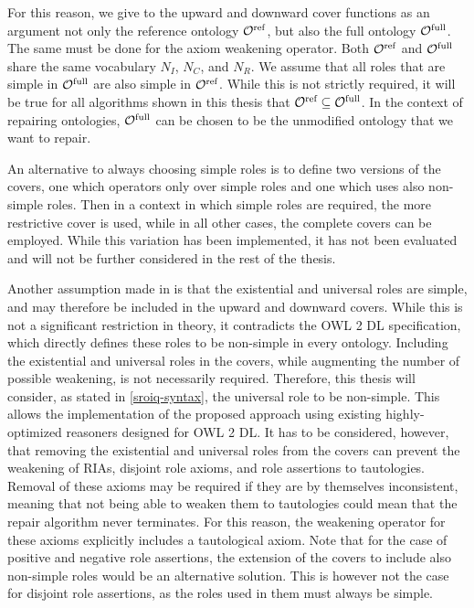 For this reason, we give to the upward and downward cover functions as an argument not only the reference ontology ${\mathcal{O}^\textnormal{ref}}$, but also the full ontology ${\mathcal{O}^\textnormal{full}}$. The same must be done for the axiom weakening operator. Both ${\mathcal{O}^\textnormal{ref}}$ and ${\mathcal{O}^\textnormal{full}}$ share the same vocabulary $N_I$, $N_C$, and $N_R$. We assume that all roles that are simple in ${\mathcal{O}^\textnormal{full}}$ are also simple in ${\mathcal{O}^\textnormal{ref}}$. While this is not strictly required, it will be true for all algorithms shown in this thesis that ${\mathcal{O}^\textnormal{ref}} \subseteq {\mathcal{O}^\textnormal{full}}$. In the context of repairing ontologies, ${\mathcal{O}^\textnormal{full}}$ can be chosen to be the unmodified ontology that we want to repair.

An alternative to always choosing simple roles is to define two versions of the covers, one which operators only over simple roles and one which uses also non-simple roles. Then in a context in which simple roles are required, the more restrictive cover is used, while in all other cases, the complete covers can be employed. While this variation has been implemented, it has not been evaluated and will not be further considered in the rest of the thesis.

Another assumption made in \cite{confalonieri2020towards} is that the existential and universal roles are simple, and may therefore be included in the upward and downward covers. While this is not a significant restriction in theory, it contradicts the OWL 2 DL specification, which directly defines these roles to be non-simple in every ontology. Including the existential and universal roles in the covers, while augmenting the number of possible weakening, is not necessarily required. Therefore, this thesis will consider, as stated in \cref{sroiq-syntax}, the universal role to be non-simple. This allows the implementation of the proposed approach using existing highly-optimized reasoners designed for OWL 2 DL. It has to be considered, however, that removing the existential and universal roles from the covers can prevent the weakening of RIAs, disjoint role axioms, and role assertions to tautologies. Removal of these axioms may be required if they are by themselves inconsistent, meaning that not being able to weaken them to tautologies could mean that the repair algorithm never terminates. For this reason, the weakening operator for these axioms explicitly includes a tautological axiom. Note that for the case of positive and negative role assertions, the extension of the covers to include also non-simple roles would be an alternative solution. This is however not the case for disjoint role assertions, as the roles used in them must always be simple.

